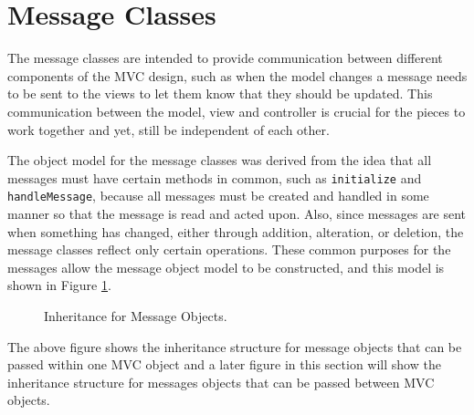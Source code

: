 \documentclass[11pt]{article}
\newcommand{\Rfunction}[1]{{\texttt{#1}}}
\begin{document}
\section{Message Classes}\label{Sec:Message}

The message classes are intended to provide communication between different
components of the MVC design, such as when the model changes a message needs to
be sent to the views to let them know that they should be updated.  This
communication between the model, view and controller is crucial for the pieces
to work together and yet, still be independent of each other. 

The object model for the message classes was derived from the idea that all
messages must have certain methods in common, such as \Rfunction{initialize}
and \Rfunction{handleMessage}, because all messages must be created and
handled in some manner so that the message is read and acted upon.  Also,
since messages are sent when something has changed, either through addition,
alteration, or deletion, the message classes reflect only certain operations.
These common purposes for the messages allow the message object model to be
constructed, and this model is shown in Figure \ref{Fig:Mess}.

\begin{figure}[ht]
  \begin{center}
    \caption{ Inheritance for Message Objects. }
    \label{Fig:Mess}
  \end{center}
\end{figure}

The above figure shows the inheritance structure for message objects that can 
be passed within one MVC object and a later figure in this section will show 
the inheritance structure for messages objects that can be passed between MVC 
objects.
\end{document}
